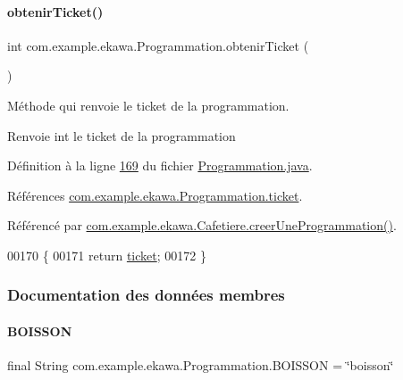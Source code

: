 \paragraph{\texorpdfstring{obtenir\+Ticket()}{obtenirTicket()}}
{\footnotesize\ttfamily int com.\+example.\+ekawa.\+Programmation.\+obtenir\+Ticket (\begin{DoxyParamCaption}{ }\end{DoxyParamCaption})}



Méthode qui renvoie le ticket de la programmation. 

\begin{DoxyReturn}{Renvoie}
int le ticket de la programmation 
\end{DoxyReturn}


Définition à la ligne \hyperlink{_programmation_8java_source_l00169}{169} du fichier \hyperlink{_programmation_8java_source}{Programmation.\+java}.



Références \hyperlink{_programmation_8java_source_l00081}{com.\+example.\+ekawa.\+Programmation.\+ticket}.



Référencé par \hyperlink{_cafetiere_8java_source_l00731}{com.\+example.\+ekawa.\+Cafetiere.\+creer\+Une\+Programmation()}.


\begin{DoxyCode}
00170     \{
00171         \textcolor{keywordflow}{return} \hyperlink{classcom_1_1example_1_1ekawa_1_1_programmation_a54ce49550025f7f5e5080f0548b08653}{ticket};
00172     \}
\end{DoxyCode}


\subsubsection{Documentation des données membres}
\mbox{\label{classcom_1_1example_1_1ekawa_1_1_programmation_a87e9e78f01480283f2d4fa9f14443034}} 
\paragraph{\texorpdfstring{B\+O\+I\+S\+S\+ON}{BOISSON}}
{\footnotesize\ttfamily final String com.\+example.\+ekawa.\+Programmation.\+B\+O\+I\+S\+S\+ON = \char`\"{}boisson\char`\"{}\hspace{0.3cm}{\ttfamily [static]}}



